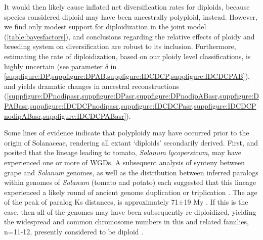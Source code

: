 It would then likely cause inflated net diversification rates for diploids, because species considered diploid may have been ancestrally polyploid, instead. %
However, we find only modest support for diploidization in the joint model  (\cref{table:bayesfactors}), and conclusions regarding the relative effects of ploidy and breeding system on diversification are robust to its inclusion.
Furthermore, estimating the rate of diploidization, based on our ploidy level classifications, is highly uncertain (see parameter $\delta$ in \cref{suppfigure:DP,suppfigure:DPAB,suppfigure:IDCDCP,suppfigure:IDCDCPAB}), and yields dramatic changes in ancestral reconstructions (\cref{suppfigure:DPnodipasr,suppfigure:DPasr,suppfigure:DPnodipABasr,suppfigure:DPABasr,suppfigure:IDCDCPnodipasr,suppfigure:IDCDCPasr,suppfigure:IDCDCPnodipABasr,suppfigure:IDCDCPABasr}).


Some lines of evidence indicate that polyploidy may have occurred prior to the origin of Solanaceae, rendering all extant `diploids' secondarily derived. %
First, \citet{ku2000} and \citet{blanc2004} posited that the lineage leading to tomato, \textit{Solanum lycopersicum}, may have experienced one or more of WGDs.
A subsequent analysis of synteny between grape and \textit{Solanum} genomes, as well as the distribution between inferred paralogs within genomes of \textit{Solanum} (tomato and potato) each suggested that this lineage experienced a likely round of ancient genome duplication or triplication \citep{tomato2012}. 
The age of the peak of paralog Ks distances, is approximately 71$\pm$19 My \citep{tomato2012}. 
If this is the case, then all of the genomes may have been subsequently re-diploidized, yielding the widespread and common chromosome numbers in this and related families, n=11-12, presently considered to be diploid \citep{robertson_2011}. 

